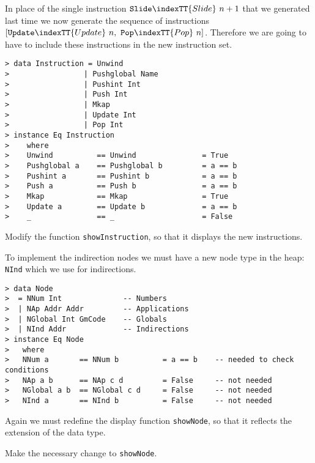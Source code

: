 In place of the single instruction $\mbox{\tt Slide}\indexTT{Slide}~n+1$ that we generated last
time we now generate the sequence of instructions $[\mbox{\tt Update}\indexTT{Update}\ n, \
\mbox{\tt Pop}\indexTT{Pop}\ n]$. Therefore we are going to have to include these
instructions in the new instruction set.
\begin{verbatim}
> data Instruction = Unwind
>                 | Pushglobal Name
>                 | Pushint Int
>                 | Push Int
>                 | Mkap
>                 | Update Int
>                 | Pop Int
> instance Eq Instruction 
>    where
>    Unwind          == Unwind               = True
>    Pushglobal a    == Pushglobal b         = a == b
>    Pushint a       == Pushint b            = a == b
>    Push a          == Push b               = a == b
>    Mkap            == Mkap                 = True
>    Update a        == Update b             = a == b
>    _               == _                    = False
\end{verbatim}
%
%
%
%
%
%
%
%
\begin{exercise}\label{gm:X:showinst2}
Modify the function \mbox{\tt showInstruction}, so that it displays the new
instructions.
\end{exercise}

To implement the indirection nodes we must have a new node type in the
heap: \mbox{\tt NInd}\indexTT{NInd} which we use for indirections.
\begin{verbatim}
> data Node 
>  = NNum Int              -- Numbers
>  | NAp Addr Addr         -- Applications
>  | NGlobal Int GmCode    -- Globals
>  | NInd Addr             -- Indirections
> instance Eq Node
>   where
>   NNum a       == NNum b          = a == b    -- needed to check conditions
>   NAp a b      == NAp c d         = False     -- not needed
>   NGlobal a b  == NGlobal c d     = False     -- not needed
>   NInd a       == NInd b          = False     -- not needed
\end{verbatim}
%
%
%
%
%
Again we must redefine the display function \mbox{\tt showNode}, so that it
reflects the extension of the data type.

\begin{exercise}\label{gm:X:shownode2}
Make the necessary change to \mbox{\tt showNode}.
\end{exercise}

